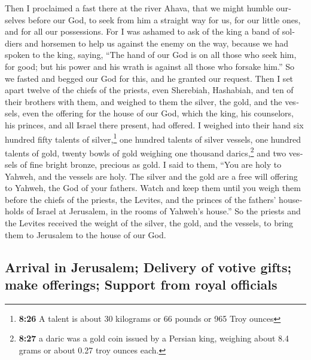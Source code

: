 \begin{paracol}{2}
\begin{otherlanguage}{english}
 Then I proclaimed a fast there at the river Ahava, that
we might humble ourselves before our God, to seek from him a straight
way for us, for our little ones, and for all our possessions.
 For I was ashamed to ask of the king a band of soldiers
and horsemen to help us against the enemy on the way, because we had
spoken to the king, saying, ``The hand of our God is on all those who
seek him, for good; but his power and his wrath is against all those who
forsake him.''  So we fasted and begged our God for this,
and he granted our request.  Then I set apart twelve of
the chiefs of the priests, even Sherebiah, Hashabiah, and ten of their
brothers with them,  and weighed to them the silver, the
gold, and the vessels, even the offering for the house of our God, which
the king, his counselors, his princes, and all Israel there present, had
offered.  I weighed into their hand six hundred fifty
talents of silver,\footnote{\textbf{8:26} A talent is about 30 kilograms
  or 66 pounds or 965 Troy ounces} one hundred talents of silver
vessels, one hundred talents of gold,  twenty bowls of
gold weighing one thousand darics,\footnote{\textbf{8:27} a daric was a
  gold coin issued by a Persian king, weighing about 8.4 grams or about
  0.27 troy ounces each.} and two vessels of fine bright bronze,
precious as gold.  I said to them, ``You are holy to
Yahweh, and the vessels are holy. The silver and the gold are a free
will offering to Yahweh, the God of your fathers.  Watch
and keep them until you weigh them before the chiefs of the priests, the
Levites, and the princes of the fathers' households of Israel at
Jerusalem, in the rooms of Yahweh's house.''  So the
priests and the Levites received the weight of the silver, the gold, and
the vessels, to bring them to Jerusalem to the house of our God.

\hypertarget{arrival-in-jerusalem-delivery-of-votive-gifts-make-offerings-support-from-royal-officials}{%
\subsection{Arrival in Jerusalem; Delivery of votive gifts; make
offerings; Support from royal
officials}\label{arrival-in-jerusalem-delivery-of-votive-gifts-make-offerings-support-from-royal-officials}}


\end{otherlanguage}
\end{paracol}
